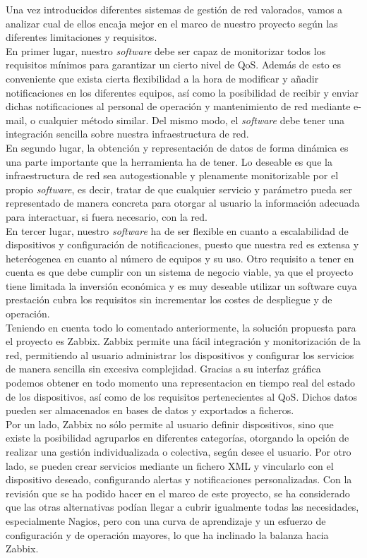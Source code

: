 	Una vez introducidos diferentes sistemas de gestión de red valorados, vamos a analizar cual de ellos encaja mejor en el marco de nuestro proyecto según las diferentes limitaciones y requisitos.\\
	
	En primer lugar, nuestro \textit{software} debe ser capaz de monitorizar todos los requisitos mínimos para garantizar un cierto nivel de QoS. Además de esto es conveniente que exista cierta flexibilidad a la hora de modificar y añadir notificaciones en los diferentes equipos, así como la posibilidad de recibir y enviar dichas notificaciones al personal de operación y mantenimiento de red mediante e-mail, o cualquier método similar. Del mismo modo, el \textit{software} debe tener una integración sencilla sobre nuestra infraestructura de red.\\
	
	En segundo lugar, la obtención y representación de datos de forma dinámica es una parte importante que la herramienta ha de tener. Lo deseable es que la infraestructura de red sea autogestionable y plenamente monitorizable por el propio \textit{software}, es decir, tratar de que cualquier servicio y parámetro pueda ser representado de manera concreta para otorgar al usuario la información adecuada para interactuar, si fuera necesario, con la red.\\
	
	En tercer lugar, nuestro \textit{software} ha de ser flexible en cuanto a escalabilidad de dispositivos y configuración de notificaciones, puesto que nuestra red es extensa y heteréogenea en cuanto al número de equipos y su uso. Otro requisito a tener en cuenta es que debe cumplir con un sistema de negocio viable, ya que el proyecto tiene limitada la inversión económica y es muy deseable utilizar un software cuya prestación cubra los requisitos sin incrementar los costes de despliegue y de operación.\\
	
	Teniendo en cuenta todo lo comentado anteriormente, la solución propuesta para el proyecto es Zabbix.	Zabbix permite una fácil integración y monitorización de la red, permitiendo al usuario administrar los dispositivos y configurar los servicios de manera sencilla sin excesiva complejidad. Gracias a su interfaz gráfica podemos obtener en todo momento una representacion en tiempo real del estado de los dispositivos, así como de los requisitos pertenecientes al QoS. Dichos datos pueden ser almacenados en bases de datos y exportados a ficheros.\\
	Por un lado, Zabbix no sólo permite al usuario definir dispositivos, sino que existe la posibilidad agruparlos en diferentes categorías, otorgando la opción de realizar una gestión individualizada o colectiva, según desee el usuario. Por otro lado, se pueden crear servicios mediante un fichero XML y vincularlo con el dispositivo deseado,  configurando alertas y notificaciones personalizadas. Con la revisión que se ha podido hacer en el marco de este proyecto, se ha considerado que las otras alternativas podían llegar a cubrir igualmente todas las necesidades, especialmente Nagios, pero con una curva de aprendizaje y un esfuerzo de configuración y de operación mayores, lo que ha inclinado la balanza hacia Zabbix.
	